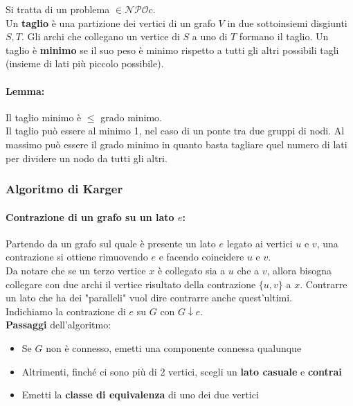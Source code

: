 Si tratta di un problema $ \in \mathcal{NPO}c$.\\

Un \textbf{taglio} è una partizione dei vertici di un grafo $V$ in due sottoinsiemi disgiunti $S, T$. Gli archi che collegano un vertice di $S$ a uno di $T$ formano il taglio. Un taglio è \textbf{minimo} se il suo peso è minimo rispetto a tutti gli altri possibili tagli (insieme di lati più piccolo possibile).\\

\paragraph{Lemma:} Il taglio minimo è $\leq$ grado minimo.\\

Il taglio può essere al minimo 1, nel caso di un ponte tra due gruppi di nodi. Al massimo può essere il grado minimo in quanto basta tagliare quel numero di lati per dividere un nodo da tutti gli altri.\\

\newpage

\subsubsection{Algoritmo di Karger}

\paragraph{Contrazione di un grafo su un lato $e$:} Partendo da un grafo sul quale è presente un lato $e$ legato ai vertici $u$ e $v$, una contrazione si ottiene rimuovendo $e$ e facendo coincidere $u$ e $v$. \\

Da notare che se un terzo vertice $x$ è collegato sia a $u$ che a $v$, allora bisogna collegare con due archi il vertice risultato della contrazione $\{u,v\}$ a $x$. Contrarre un lato che ha dei "paralleli" vuol dire contrarre anche quest'ultimi.\\

Indichiamo la contrazione di $e$ su $G$ con $G \downarrow e$.\\

\textbf{Passaggi} dell'algoritmo:
\begin{itemize}
	\item Se $G$ non è connesso, emetti una componente connessa qualunque
	\item Altrimenti, finché ci sono più di 2 vertici, scegli un \textbf{lato casuale} e \textbf{contrai}
	\item Emetti la \textbf{classe di equivalenza} di uno dei due vertici
\end{itemize}

